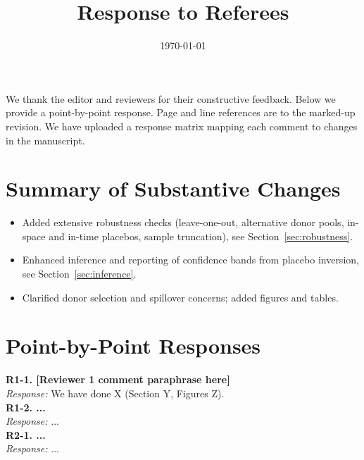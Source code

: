 \documentclass[11pt]{article}
\title{Response to Referees}
\date{\today}
\begin{document}
\maketitle
\onehalfspacing

We thank the editor and reviewers for their constructive feedback. Below we provide a point-by-point response. Page and line references are to the marked-up revision. We have uploaded a response matrix mapping each comment to changes in the manuscript.

\section*{Summary of Substantive Changes}
\begin{itemize}[itemsep=0.3em]
\item Added extensive robustness checks (leave-one-out, alternative donor pools, in-space and in-time placebos, sample truncation), see Section~\ref{sec:robustness}.
\item Enhanced inference and reporting of confidence bands from placebo inversion, see Section~\ref{sec:inference}.
\item Clarified donor selection and spillover concerns; added figures and tables.
\end{itemize}

\section*{Point-by-Point Responses}
\textbf{R1-1. [Reviewer 1 comment paraphrase here]}\\
\textit{Response:} We have done X (Section Y, Figures Z).\\

\textbf{R1-2. ...}\\
\textit{Response:} ...\\

\textbf{R2-1. ...}\\
\textit{Response:} ...\\
\end{document}
